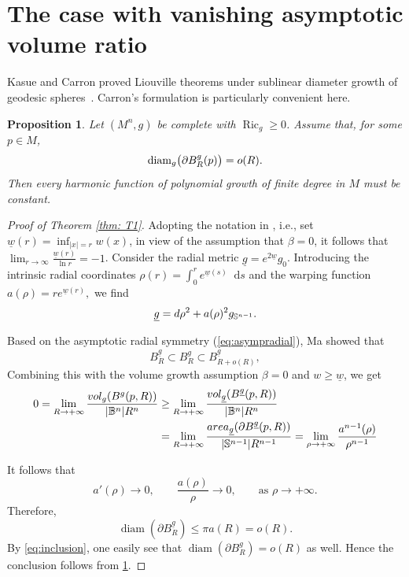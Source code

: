 \documentclass[12pt]{amsart}
\theoremstyle{plain}
\newtheorem{proposition}[theorem]{Proposition}
\theoremstyle{definition}
\theoremstyle{remark}     %
\numberwithin{equation}{section}
\newcommand{\dd}{\mathop{}\!\mathrm{d}}%
\begin{document}
\section{The case with vanishing asymptotic volume ratio}

Kasue and Carron proved Liouville theorems under sublinear diameter growth of geodesic spheres~\cite{K1,K2,C}. Carron's  formulation \cite[Theorem 1.1]{C} is particularly convenient here.
\begin{proposition} \label{prop:diam}
Let $(M^n,g)$ be complete with $\operatorname{Ric}_g\ge0$.  Assume that, for some $p\in M$,
\begin{equation}\notag
 \operatorname{diam}_g\bigl(\partial B_R^g(p)\bigr)=o(R).
\end{equation}
Then every harmonic function of polynomial growth of finite degree in $M$ must be constant.
\end{proposition}

\begin{proof}[Proof of Theorem \ref{thm: T1}]
Adopting the notation in \cite{M}, i.e., set $\underline{w}(r)=\inf_{|x|=r} w(x)$, in view of the assumption that $\beta=0$, 
it follows that $\lim_{r\to \infty} \frac{\underline{w}(r)}{\ln r}=- 1$. Consider the radial metric $\underline{g}=e^{2\underline{w}} g_0$. Introducing the intrinsic radial coordinates
$\rho(r)=\int_0^r e^{\underline{w}(s)}\dd s$ and the warping function
$ a(\rho)=r e^{\underline{w}(r)},$
we find 
\begin{equation}\notag
 \underline{g}
 =d\rho^2+a(\rho)^2g_{\mathbb{S}^{n-1}}.
\end{equation}

Based on the asymptotic radial symmetry (\ref{eq:asympradial}), Ma \cite[Page 29]{M} showed that 
\begin{equation} \label{eq:inclusion}
B^{\underline{g}}_R\subset B^{g}_R\subset B^{\underline{g}}_{R+o(R)},
\end{equation}
Combining this with the volume growth assumption $\beta=0$ and $w\geq \underline{w}$, we get 
\begin{align*}
    0=\lim_{R\to+\infty}
    \frac{vol_g(B^g(p,R))}{|\mathbb{B}^n|R^n}
    &\geq \lim_{R\to+\infty}
    \frac{vol_{\underline{g}}(B^{\underline{g}}(p,R))}{|\mathbb{B}^n|R^n} \\ \notag
    &=\lim_{R\to+\infty}
    \frac{area_{\underline{g}}
    (\partial B^{\underline{g}}(p,R))}{|\mathbb{S}^{n-1}|R^{n-1}} 
    =\lim_{\rho\to+\infty}
    \frac{a^{n-1}(\rho)}{\rho^{n-1}}
\end{align*}

It follows that
\begin{equation}\label{eq:a-small}
 a'(\rho)\to0,
 \qquad
 \frac{a(\rho)}{\rho}\to0,\qquad 
 \text{as }\rho\to+\infty.
\end{equation}
Therefore, 
\[
\operatorname{diam}(\partial B^{\underline{g}}_R)\leq \pi a(R)=o(R).
\]
By \cref{eq:inclusion}, one easily see that $\operatorname{diam}(\partial B^{g}_R)=o(R)$ as well. Hence the conclusion follows from \cref{prop:diam}.
\end{proof}
\end{document}
